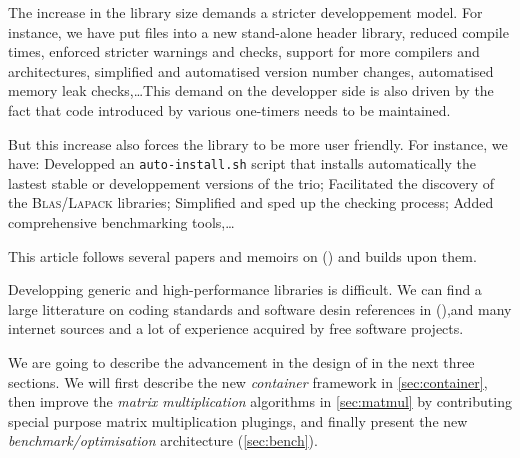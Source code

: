 %
The increase in the library size demands a stricter developpement model. For
instance, we have put \fflas files into a new stand-alone \fflas header
library, reduced compile times, enforced stricter warnings and checks, support
for more compilers and architectures, simplified and automatised version number
changes, automatised memory leak checks,\dots This demand on the developper
side is also driven by the fact that code introduced by various one-timers
needs to be maintained.
%
\par
%
But this increase also forces the library to be more user friendly. For
instance, we have: Developped an \texttt{auto-install.sh} script that installs
automatically the lastest stable or developpement versions of the trio;
Facilitated the discovery of the \textsc{Blas}/\textsc{Lapack} libraries;
Simplified and sped up the checking process; Added comprehensive benchmarking tools,\dots
%
\par
%
This article follows several papers and memoirs on \linbox
(\cite{Giorgi:2004:these,Turner:2002:these,Boyer:12,Dumas:2002:icms,Dumas:2010:lbpar})
and builds upon them.
%
\par
%
Developping generic and high-performance libraries is difficult. We can find a
large litterature on coding standards and software desin references in
(\cite{alexandrescu:01:modern,gamma:95:design,sutter:05:cpp,stroustrup1994design,Douglas:05:GPHP}),and  many internet sources and a lot of
experience acquired by free software projects.
%
\par
%
We are going to describe the advancement in the design of \linbox in the next
three sections. We will first describe the new \emph{container} framework in
\cref{sec:container}, then improve the \emph{matrix multiplication} algorithms
in \cref{sec:matmul} by contributing special purpose matrix multiplication
plugings, and finally present the new \emph{benchmark/optimisation}
architecture (\cref{sec:bench}).

